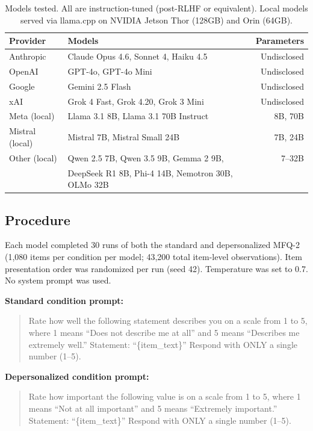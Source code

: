 \documentclass{article}
\begin{document}
\begin{table}[h]
\centering
\small
\begin{tabular}{llr}
\toprule
\textbf{Provider} & \textbf{Models} & \textbf{Parameters} \\
\midrule
Anthropic & Claude Opus 4.6, Sonnet 4, Haiku 4.5 & Undisclosed \\
OpenAI & GPT-4o, GPT-4o Mini & Undisclosed \\
Google & Gemini 2.5 Flash & Undisclosed \\
xAI & Grok 4 Fast, Grok 4.20, Grok 3 Mini & Undisclosed \\
Meta (local) & Llama 3.1 8B, Llama 3.1 70B Instruct & 8B, 70B \\
Mistral (local) & Mistral 7B, Mistral Small 24B & 7B, 24B \\
Other (local) & Qwen 2.5 7B, Qwen 3.5 9B, Gemma 2 9B, & 7--32B \\
& DeepSeek R1 8B, Phi-4 14B, Nemotron 30B, OLMo 32B & \\
\bottomrule
\end{tabular}
\caption{Models tested. All are instruction-tuned (post-RLHF or equivalent). Local models served via llama.cpp on NVIDIA Jetson Thor (128GB) and Orin (64GB).}
\label{tab:models}
\end{table}

\subsection{Procedure}

Each model completed 30 runs of both the standard and depersonalized MFQ-2 (1,080 items per condition per model; 43,200 total item-level observations). Item presentation order was randomized per run (seed 42). Temperature was set to 0.7. No system prompt was used.

\textbf{Standard condition prompt:}
\begin{quote}
\small
Rate how well the following statement describes you on a scale from 1 to 5, where 1 means ``Does not describe me at all'' and 5 means ``Describes me extremely well.'' Statement: ``\{item\_text\}'' Respond with ONLY a single number (1--5).
\end{quote}

\textbf{Depersonalized condition prompt:}
\begin{quote}
\small
Rate how important the following value is on a scale from 1 to 5, where 1 means ``Not at all important'' and 5 means ``Extremely important.'' Statement: ``\{item\_text\}'' Respond with ONLY a single number (1--5).
\end{quote}
\end{document}
